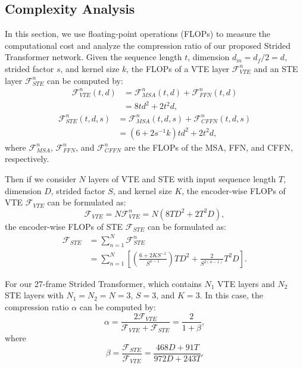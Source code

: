 \documentclass[journal]{IEEEtran}
\begin{document}
\subsection{Complexity Analysis}
In this section, we use floating-point operations (FLOPs) to measure the computational cost and analyze the compression ratio of our proposed Strided Transformer network. 
Given the sequence length $t$, dimension $d_{m}=d_{f}/2=d$, strided factor $s$, and kernel size $k$, the FLOPs of a VTE layer $\mathcal{F}_{VTE}^{n}$ and an STE layer $\mathcal{F}_{STE}^{n}$ can be computed by: 
\begin{equation}
\begin{aligned}
   \mathcal{F}_{VTE}^{n}(t, d) &=\mathcal{F}_{MSA}^{n}(t, d)+\mathcal{F}_{FFN}^{n}(t, d) \\
   &=8 t d^{2} + 2 t^{2} d,
\end{aligned}
\end{equation}
\begin{equation}
\begin{aligned}
   \mathcal{F}_{STE}^{n}(t, d, s) &=\mathcal{F}_{MSA}^{n}(t, d, s)+\mathcal{F}_{CFFN}^{n}(t, d, s) \\
   &=(6+2s^{-1}k) t d^{2} + 2 t^{2} d,
\end{aligned}
\end{equation}
where $\mathcal{F}_{MSA}^{n}$, $\mathcal{F}_{FFN}^{n}$, and $\mathcal{F}_{CFFN}^{n}$ are the FLOPs of the MSA, FFN, and CFFN, respectively. 

Then if we consider $N$ layers of VTE and STE with input sequence length $T$, dimension $D$, strided factor $S$, and kernel size $K$, the encoder-wise FLOPs of VTE $\mathcal{F}_{VTE}$ can be formulated as:
\begin{equation}
   \mathcal{F}_{VTE} =N\mathcal{F}_{VTE}^{n} = {N}(8 T D^{2} + 2T^{2} D),
\end{equation}
the encoder-wise FLOPs of STE $\mathcal{F}_{STE}$ can be formulated as:
\begin{equation}
   \begin{aligned}
      \mathcal{F}_{STE} &=\sum_{n=1}^{N}\mathcal{F}_{STE}^{n} \\[0.5mm] 
      &= \sum_{n=1}^{N}\left[(\frac{6+2KS^{-1}}{S^{n-1}}) T D ^{2} + \frac{2}{S^{2(n-1)}}T^{2} D\right]. 
   \end{aligned}
\end{equation}

For our 27-frame Strided Transformer, which contains $N_{1}$ VTE layers and $N_{2}$ STE layers with $N_{1}=N_{2}=N=3$, $S=3$, and $K=3$.
In this case, the compression ratio $\alpha$ can be computed by: 
\begin{equation}
   \alpha = \frac{2\mathcal{F}_{VTE}}{\mathcal{F}_{VTE}+\mathcal{F}_{STE}} =\frac{2}{1+\beta}, 
\end{equation}
where 
\begin{equation}
   \beta = \frac{\mathcal{F}_{STE}}{\mathcal{F}_{VTE}} = \frac{468D+91T}{972D+243T}.
\end{equation}
\end{document}

